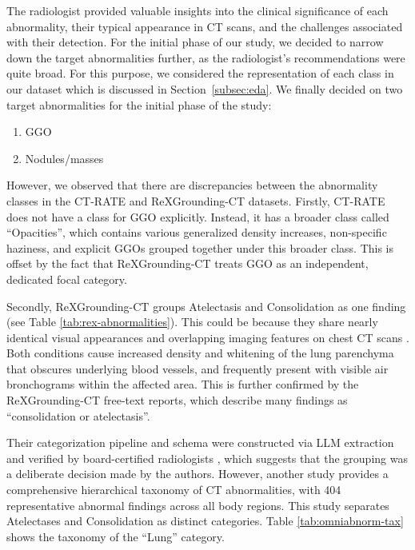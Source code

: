 The radiologist provided valuable insights into the clinical significance of each abnormality,
their typical appearance in CT scans, and the challenges associated with their detection.
For the initial phase of our study, we decided to narrow down the target abnormalities further, as the radiologist's recommendations
were quite broad. For this purpose, we considered the representation of each class in our dataset which is discussed in
Section~\ref{subsec:eda}. We finally decided on two target abnormalities for the initial phase of the study:

\begin{enumerate}
    \item GGO
    \item Nodules/masses
\end{enumerate}

However, we observed that there are discrepancies between the abnormality classes in the CT-RATE and ReXGrounding-CT datasets.
Firstly, CT-RATE does not have a class for GGO explicitly. Instead, it has a broader class called ``Opacities'', which contains
various generalized density increases, non-specific haziness, and explicit GGOs grouped together under this broader class.
This is offset by the fact that ReXGrounding-CT treats GGO as an independent, dedicated focal category.

Secondly, ReXGrounding-CT groups Atelectasis and Consolidation as one finding (see Table \ref{tab:rex-abnormalities}).
This could be because they share nearly identical visual appearances and overlapping imaging features on chest CT scans \cite{yang2009detection}.
Both conditions cause increased density and whitening of the lung parenchyma that obscures underlying blood vessels, and
frequently present with visible air bronchograms within the affected area.
This is further confirmed by the ReXGrounding-CT free-text reports, which describe many findings as ``consolidation or atelectasis''.

Their categorization pipeline and schema were constructed via LLM extraction and verified by board-certified
radiologists \cite{rajpurkar2024rexgroundingct}, which suggests that the grouping was a deliberate decision made by the authors.
However, another study \cite{zhao2026rethinking} provides a comprehensive hierarchical taxonomy of CT abnormalities, with 404
representative abnormal findings across all body regions. This study separates Atelectases and Consolidation as distinct categories.
Table \ref{tab:omniabnorm-tax} shows the taxonomy of the ``Lung'' category.

